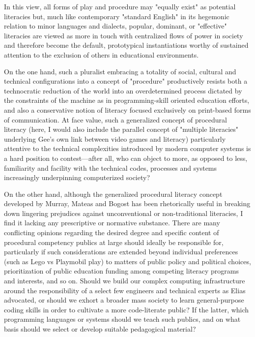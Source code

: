 In this view, all forms of play and procedure may "equally exist" as potential literacies but, much like contemporary "standard English" in its hegemonic relation to minor languages and dialects, popular, dominant, or "effective" literacies are viewed as more in touch with centralized flows of power in society and therefore become the default, prototypical instantiations worthy of sustained attention to the exclusion of others in educational environments.

On the one hand, such a pluralist embracing a totality of social, cultural and technical configurations into a concept of "procedure" productively resists both a technocratic reduction of the world into an overdetermined process dictated by the constraints of the machine as in programming-skill oriented education efforts, and also a conservative notion of literacy focused exclusively on print-based forms of communication. At face value, such a generalized concept of procedural literacy (here, I would also include the parallel concept of "multiple literacies" underlying Gee's own link between video games and literacy) particularly attentive to the technical complexities introduced by modern computer systems is a hard position to contest---after all, who can object to more, as opposed to less, familiarity and facility with the technical codes, processes and systems increasingly underpinning computerized society?

On the other hand, although the generalized procedural literacy concept developed by Murray, Mateas and Bogost has been rhetorically useful in breaking down lingering prejudices against unconventional or non-traditional literacies, I find it lacking any prescriptive or normative substance. There are many conflicting opinions regarding the desired degree and specific content of procedural competency publics at large should ideally be responsible for, particularly if such considerations are extended beyond individual preferences (such as Lego vs Playmobil play) to matters of public policy and political choices, prioritization of public education funding among competing literacy programs and interests, and so on. Should we build our complex computing infrastructure around the responsibility of a select few engineers and technical experts as Elias advocated, or should we exhort a broader mass society to learn general-purpose coding skills in order to cultivate a more code-literate public? If the latter, which programming languages or systems should we teach such publics, and on what basis should we select or develop suitable pedagogical material?


